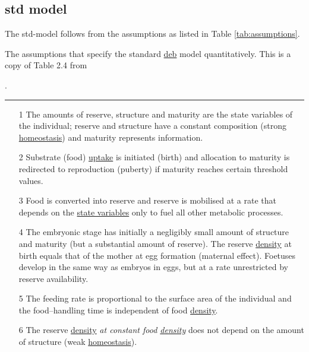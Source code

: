 \subsection{std model}

The std-model follows from the assumptions as listed in Table \ref{tab:assumptions}.

\begin{table}[tb]\small
\caption[]{\label{tab:assumptions}\protect\small 
   The assumptions that specify the standard \hyperref[glos:DEB]{\sc deb}
  model quantitatively. This is a copy of Table 2.4 from \citet{Kooy2010}
	}.

  \rule{16cm}{.1mm}
\begin{itemize}
  
\item[1] The amounts of reserve, structure and maturity are the state variables of the individual; 
  reserve and structure have a constant composition (strong \hyperref[glos:homeostasis]{homeostasis}) and maturity represents information.
  
\item[2] Substrate (food) \hyperref[glos:uptake]{uptake} is initiated (birth) and allocation to maturity is redirected to reproduction (puberty) if maturity reaches certain threshold values.
  
\item[3] Food is converted into reserve and reserve is mobilised at a rate that depends on the \hyperref[glos:state_variable]{state variables} only to fuel all other metabolic processes.
  
\item[4] The embryonic stage has initially a negligibly small amount of structure and maturity (but a substantial amount of reserve).
  The reserve \hyperref[glos:density]{density} at birth equals that of the mother at egg formation (maternal effect).
  Foetuses develop in the same way as embryos in eggs, but at a rate unrestricted by reserve availability.
  
\item[5] The feeding rate is proportional to the surface area of the individual and the food--handling time is independent of food \hyperref[glos:density]{density}.
 
\item[6] The reserve \hyperref[glos:density]{density} \emph{at constant food \hyperref[glos:density]{density}} does not depend on the amount of structure (weak \hyperref[glos:homeostasis]{homeostasis}).
  

\end{itemize}
\end{table}
